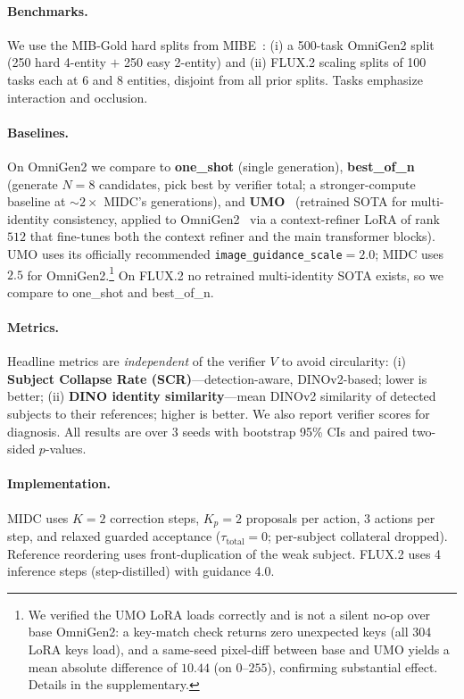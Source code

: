 \documentclass[letterpaper]{article}
\begin{document}
\paragraph{Benchmarks.} We use the MIB-Gold hard splits from MIBE~\citep{anon2025mibe}: (i) a 500-task OmniGen2 split (250 hard 4-entity $+$ 250 easy 2-entity) and (ii) FLUX.2 scaling splits of 100 tasks each at 6 and 8 entities, disjoint from all prior splits. Tasks emphasize interaction and occlusion.

\paragraph{Baselines.} On OmniGen2 we compare to \textbf{one\_shot} (single generation), \textbf{best\_of\_n} (generate $N{=}8$ candidates, pick best by verifier total; a stronger-compute baseline at $\sim 2\times$ MIDC's generations), and \textbf{UMO}~\citep{cheng2025umo} (retrained SOTA for multi-identity consistency, applied to OmniGen2~\citep{wu2025omnigen2} via a context-refiner LoRA of rank $512$ that fine-tunes both the context refiner and the main transformer blocks). UMO uses its officially recommended \texttt{image\_guidance\_scale}$=2.0$; MIDC uses $2.5$ for OmniGen2.\footnote{We verified the UMO LoRA loads correctly and is not a silent no-op over base OmniGen2: a key-match check returns zero unexpected keys (all 304 LoRA keys load), and a same-seed pixel-diff between base and UMO yields a mean absolute difference of $10.44$ (on $0$–$255$), confirming substantial effect. Details in the supplementary.} On FLUX.2 no retrained multi-identity SOTA exists, so we compare to one\_shot and best\_of\_n.

\paragraph{Metrics.} Headline metrics are \emph{independent} of the verifier $V$ to avoid circularity: (i) \textbf{Subject Collapse Rate (SCR)}---detection-aware, DINOv2-based; lower is better; (ii) \textbf{DINO identity similarity}---mean DINOv2 similarity of detected subjects to their references; higher is better. We also report verifier scores for diagnosis. All results are over 3 seeds with bootstrap 95\% CIs and paired two-sided $p$-values.

\paragraph{Implementation.} MIDC uses $K{=}2$ correction steps, $K_p{=}2$ proposals per action, 3 actions per step, and relaxed guarded acceptance ($\tau_{\mathrm{total}}{=}0$; per-subject collateral dropped). Reference reordering uses front-duplication of the weak subject. FLUX.2 uses 4 inference steps (step-distilled) with guidance 4.0.
\end{document}

